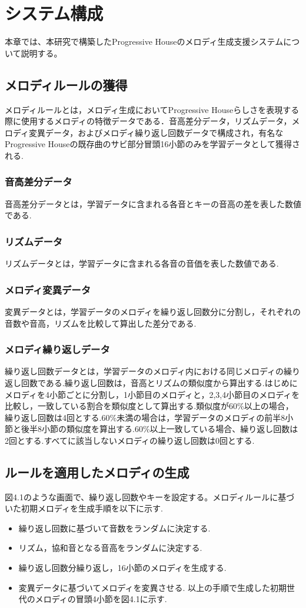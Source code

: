 \chapter{システム構成}
本章では、本研究で構築したProgressive Houseのメロディ生成支援システムについて説明する。

\section{メロディルールの獲得}
メロディルールとは，メロディ生成においてProgressive Houseらしさを表現する際に使用するメロディの特徴データである．音高差分データ，リズムデータ，メロディ変異データ，およびメロディ繰り返し回数データで構成され，有名なProgressive Houseの既存曲のサビ部分冒頭16小節のみを学習データとして獲得される.
\subsection{音高差分データ}
音高差分データとは，学習データに含まれる各音とキーの音高の差を表した数値である.
\subsection{リズムデータ}
リズムデータとは，学習データに含まれる各音の音価を表した数値である.
\subsection{メロディ変異データ}
変異データとは，学習データのメロディを繰り返し回数分に分割し，それぞれの音数や音高，リズムを比較して算出した差分である.
\subsection{メロディ繰り返しデータ}
繰り返し回数データとは，学習データのメロディ内における同じメロディの繰り返し回数である.繰り返し回数は，音高とリズムの類似度から算出する.はじめにメロディを4小節ごとに分割し，1小節目のメロディと，2,3,4小節目のメロディを比較し，一致している割合を類似度として算出する.類似度が60\%以上の場合，繰り返し回数は4回とする.60\%未満の場合は，学習データのメロディの前半8小節と後半8小節の類似度を算出する.60\%以上一致している場合、繰り返し回数は2回とする.すべてに該当しないメロディの繰り返し回数は0回とする.

\section{ルールを適用したメロディの生成}
図4.1のような画面で、繰り返し回数やキーを設定する。メロディルールに基づいた初期メロディを生成手順を以下に示す.
\begin{itemize}
  \item 繰り返し回数に基づいて音数をランダムに決定する.
  \item リズム，協和音となる音高をランダムに決定する.
  \item 繰り返し回数分繰り返し，16小節のメロディを生成する.
  \item 変異データに基づいてメロディを変異させる. 以上の手順で生成した初期世代のメロディの冒頭4小節を図4.1に示す.
\end{itemize}

